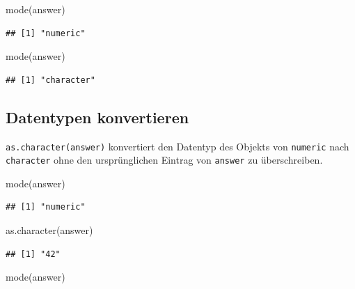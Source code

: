 \documentclass[
]{book}
\newenvironment{Shaded}{\begin{snugshade}}{\end{snugshade}}
\newcommand{\FunctionTok}[1]{\textcolor[rgb]{0.00,0.00,0.00}{#1}}
\newcommand{\NormalTok}[1]{#1}
\newcommand{\StringTok}[1]{\textcolor[rgb]{0.31,0.60,0.02}{#1}}
\begin{document}
\begin{Shaded}
\begin{Highlighting}[]
\FunctionTok{mode}\NormalTok{(answer)}
\end{Highlighting}
\end{Shaded}

\begin{verbatim}
## [1] "numeric"
\end{verbatim}

\begin{Shaded}
\begin{Highlighting}[]
\FunctionTok{mode}\NormalTok{(}\StringTok{\textquotesingle{}answer\textquotesingle{}}\NormalTok{)}
\end{Highlighting}
\end{Shaded}

\begin{verbatim}
## [1] "character"
\end{verbatim}

\hypertarget{datentypen-konvertieren}{%
\subsection*{Datentypen konvertieren}\label{datentypen-konvertieren}}

\texttt{as.character(answer)} konvertiert den Datentyp des Objekts von \texttt{numeric} nach \texttt{character} ohne den ursprünglichen Eintrag von \texttt{answer} zu überschreiben.

\begin{Shaded}
\begin{Highlighting}[]
\FunctionTok{mode}\NormalTok{(answer)}
\end{Highlighting}
\end{Shaded}

\begin{verbatim}
## [1] "numeric"
\end{verbatim}

\begin{Shaded}
\begin{Highlighting}[]
\FunctionTok{as.character}\NormalTok{(answer)}
\end{Highlighting}
\end{Shaded}

\begin{verbatim}
## [1] "42"
\end{verbatim}

\begin{Shaded}
\begin{Highlighting}[]
\FunctionTok{mode}\NormalTok{(answer)}
\end{Highlighting}
\end{Shaded}
\end{document}
